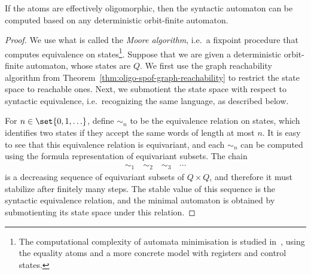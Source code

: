 \begin{theorem}\label{thm:compute-minimal}
	If the atoms are effectively oligomorphic, then the syntactic automaton can be computed based on any deterministic orbit-finite automaton.
\end{theorem}
\begin{proof}
	We use what is called the \emph{Moore algorithm}, i.e.~a fixpoint procedure that computes equivalence on states\footnote{The computational complexity of automata minimisation is studied in~\cite{DBLP:conf/lics/MurawskiRT15}, using the equality atoms and a more concrete model with registers and control states. }. Suppose that we are given a deterministic orbit-finite automaton, whose  states  are $Q$. We first use the graph reachability algorithm from Theorem~\ref{thm:oligo-spof-graph-reachability} to restrict the state space to reachable ones. Next, we submotient the state space with respect to syntactic equivalence, i.e.~recognizing the same language, as described below.

	For $n \in \set{0,1,\ldots}$, define $\sim_n$ to be the equivalence relation  on states, which identifies two states if they accept the same words of length at most $n$. It is easy to see that this equivalence relation is equivariant, and each $\sim_n$ can be computed using the formula representation of equivariant subsets. The chain 
	\begin{align*}
	\sim_1 \quad \sim_2 \quad \sim_3 \quad \cdots
	\end{align*}
	is a decreasing sequence of equivariant subsets of $Q \times Q$, and therefore it must stabilize after finitely many steps. The stable value of this sequence is the syntactic equivalence relation, and the minimal automaton is obtained by submotienting its state space under this relation.
\end{proof}




\newcommand{\afin}{A_{\mathrm{fin}}}
\newcommand{\qfin}{Q_{\mathrm{fin}}}




\exercisepart





